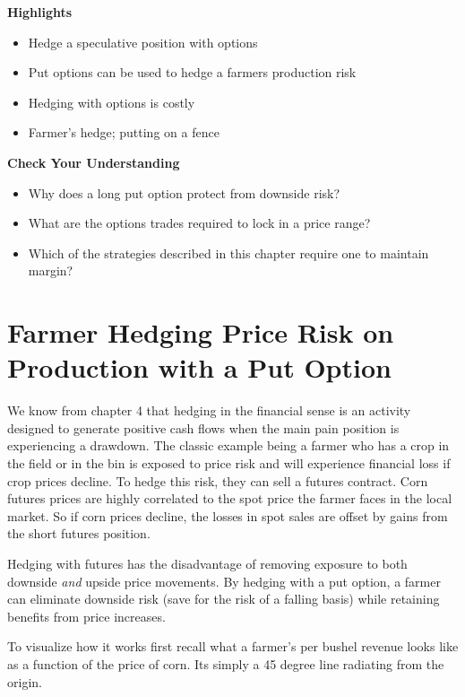 \documentclass[
]{book}
\providecommand{\tightlist}{%
  \setlength{\itemsep}{0pt}\setlength{\parskip}{0pt}}
\begin{document}
\textbf{Highlights}

\begin{itemize}
\tightlist
\item
  Hedge a speculative position with options
\item
  Put options can be used to hedge a farmers production risk
\item
  Hedging with options is costly
\item
  Farmer's hedge; putting on a fence
\end{itemize}

\textbf{Check Your Understanding}

\begin{itemize}
\tightlist
\item
  Why does a long put option protect from downside risk?
\item
  What are the options trades required to lock in a price range?
\item
  Which of the strategies described in this chapter require one to maintain margin?
\end{itemize}

\hypertarget{farmer-hedging-price-risk-on-production-with-a-put-option}{%
\section{Farmer Hedging Price Risk on Production with a Put Option}\label{farmer-hedging-price-risk-on-production-with-a-put-option}}

We know from chapter 4 that hedging in the financial sense is an activity designed to generate positive cash flows when the main pain position is experiencing a drawdown. The classic example being a farmer who has a crop in the field or in the bin is exposed to price risk and will experience financial loss if crop prices decline. To hedge this risk, they can sell a futures contract. Corn futures prices are highly correlated to the spot price the farmer faces in the local market. So if corn prices decline, the losses in spot sales are offset by gains from the short futures position.

Hedging with futures has the disadvantage of removing exposure to both downside \emph{and} upside price movements. By hedging with a put option, a farmer can eliminate downside risk (save for the risk of a falling basis) while retaining benefits from price increases.

To visualize how it works first recall what a farmer's per bushel revenue looks like as a function of the price of corn. Its simply a 45 degree line radiating from the origin.
\end{document}
